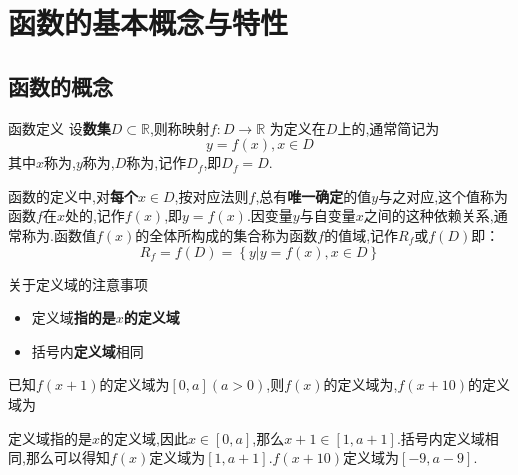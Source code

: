 \documentclass[8pt a4paper, oneside, UTF8]{ctexbook}  %
\begin{document}
\begin{sloppypar}
    \section{函数的基本概念与特性}
    \subsection{函数的概念}
    \begin{defn}{函数定义}{}
        设\textbf{数集}$D \subset \mathbb{R}$,则称映射$f:D \to \mathbb{R}$ 为定义在$D$上的,通常简记为
        $$
            y=f(x),x \in D
        $$
        其中$x$称为,$y$称为,$D$称为,记作$D_f$,即$D_f=D$.
    \end{defn}
    函数的定义中,对\textbf{每个}$x \in D$,按对应法则$f$,总有\textbf{唯一确定}的值$y$与之对应,这个值称为函数$f$在$x$处的,记作$f(x)$,即$y=f(x)$.因变量$y$与自变量$x$之间的这种依赖关系,通常称为.函数值$f(x)$的全体所构成的集合称为函数$f$的值域,记作$R_f$或$f(D)$即：
    $$
        R_{f}=f(D)=\left\{y|y=f(x),x\in D\right\}
    $$
    \begin{criterion}{关于定义域的注意事项}{}
        \begin{itemize}
            \item 定义域\textbf{指的是$x$的定义域}
            \item 括号内\textbf{定义域}相同
        \end{itemize}
    \end{criterion}
    \begin{problem}
        已知$f(x+1)$的定义域为$[0,a](a>0)$,则$f(x)$的定义域为,$f(x+10)$的定义域为
        \end{problem}
        \begin{solution}
            定义域指的是$x$的定义域,因此$x \in [0,a]$,那么$x+1 \in [1,a+1]$.括号内定义域相同,那么可以得知$f(x)$定义域为$[1,a+1]$.$f(x+10)$定义域为$[-9,a-9]$.
        \end{solution}

\end{sloppypar}
\end{document}
